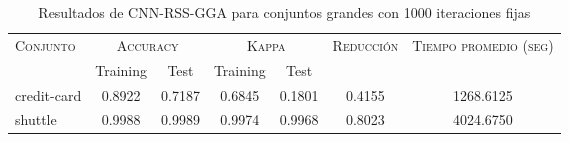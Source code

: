 \begin{table}[]
\centering
\begin{tabular}{l c c c c c c}
\hline
\multirow{2}{*}{\textsc{Conjunto}}
	& \multicolumn{2}{c}{\textsc{Accuracy}}
	& \multicolumn{2}{c}{\textsc{Kappa}}
	& \textsc{Reducción}
	& \textsc{Tiempo promedio (seg)} \\
	& Training & Test
	& Training & Test \\ 
\hline
\hline

credit-card & 0.8922 & 0.7187 & 0.6845 & 0.1801 & 0.4155 & 1268.6125 \\
shuttle & 0.9988 & 0.9989 & 0.9974 & 0.9968 & 0.8023 & 4024.6750 \\

\hline
\end{tabular}
\caption{Resultados de CNN-RSS-GGA para conjuntos grandes con 1000 iteraciones fijas}
\label{res-grande-cnn-rss-gga}
\end{table}

